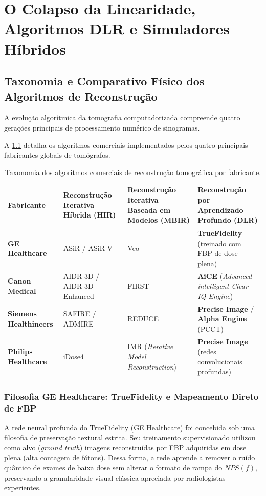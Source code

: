 \chapter{O Colapso da Linearidade, Algoritmos DLR e Simuladores Híbridos}
\label{chap:colapso_linearidade}

\section{Taxonomia e Comparativo Físico dos Algoritmos de Reconstrução}
\label{sec:taxonomia_dlr}

A evolução algorítmica da tomografia computadorizada compreende quatro gerações principais de processamento numérico de sinogramas.

A \cref{tab:taxonomia_algoritmos} detalha os algoritmos comerciais implementados pelos quatro principais fabricantes globais de tomógrafos.

\begin{table}[htbp]
  \centering
  \small
  \caption{Taxonomia dos algoritmos comerciais de reconstrução tomográfica por fabricante.}
  \label{tab:taxonomia_algoritmos}
  \begin{tabularx}{\textwidth}{lXXX}
    \toprule
    \textbf{Fabricante} & \textbf{Reconstrução Iterativa Híbrida (HIR)} & \textbf{Reconstrução Iterativa Baseada em Modelos (MBIR)} & \textbf{Reconstrução por Aprendizado Profundo (DLR)} \\
    \midrule
    \textbf{GE Healthcare} & ASiR / ASiR-V & Veo & \textbf{TrueFidelity} (treinado com FBP de dose plena) \\
    \textbf{Canon Medical} & AIDR 3D / AIDR 3D Enhanced & FIRST & \textbf{AiCE} (\emph{Advanced intelligent Clear-IQ Engine}) \\
    \textbf{Siemens Healthineers} & SAFIRE / ADMIRE & REDUCE & \textbf{Precise Image} / \textbf{Alpha Engine} (PCCT) \\
    \textbf{Philips Healthcare} & iDose4 & IMR (\emph{Iterative Model Reconstruction}) & \textbf{Precise Image} (redes convolucionais profundas) \\
    \bottomrule
  \end{tabularx}
\end{table}

\subsection{Filosofia GE Healthcare: TrueFidelity e Mapeamento Direto de FBP}
A rede neural profunda do TrueFidelity (GE Healthcare) foi concebida sob uma filosofia de preservação textural estrita. Seu treinamento supervisionado utilizou como alvo (\emph{ground truth}) imagens reconstruídas por FBP adquiridas em dose plena (alta contagem de fótons). Dessa forma, a rede aprende a remover o ruído quântico de exames de baixa dose sem alterar o formato de rampa do $NPS(f)$, preservando a granularidade visual clássica apreciada por radiologistas experientes.

